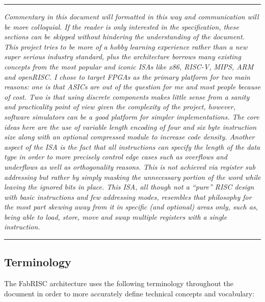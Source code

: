\documentclass{article}
\begin{document}
        \par\noindent\rule{\textwidth}{0.4pt}
        \textit{Commentary in this document will formatted in this way and communication will be more colloquial. If the reader is only interested in the specification, these sections can be skipped without hindering the understanding of the document. This project tries to be more of a hobby learning experience rather than a new super serious industry standard, plus the architecture borrows many existing concepts from the most popular and iconic ISAs like x86, RISC-V, MIPS, ARM and openRISC. I chose to target FPGAs as the primary platform for two main reasons: one is that ASICs are out of the question for me and most people because of cost. Two is that using discrete components makes little sense from a sanity and practicality point of view given the complexity of the project, however, software simulators can be a good platform for simpler implementations. The core ideas here are the use of variable length encoding of four and six byte instruction size along with an optional compressed module to increase code density. Another aspect of the ISA is the fact that all instructions can specify the length of the data type in order to more precisely control edge cases such as overflows and underflows as well as orthogonality reasons. This is not achieved via register sub addressing but rather by simply masking the unnecessary portion of the word while leaving the ignored bits in place. This ISA, all though not a ``pure'' RISC design with basic instructions and few addressing modes, resembles that philosophy for the most part skewing away from it in specific (and optional) areas only, such as, being able to load, store, move and swap multiple registers with a single instruction.}
        \par\noindent\rule{\textwidth}{0.4pt}

        \subsection[Terminology]{Terminology}

            \vspace{10pt}

            The FabRISC architecture uses the following terminology throughout the document in order to more accurately define technical concepts and vocabulary:
\end{document}
